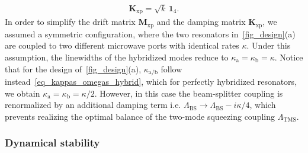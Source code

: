 \documentclass[%
reprint,
floatfix,
superscriptaddress,
amsmath,amssymb,
aps,
pra,
]{revtex4-2}
\newcommand*{\scrpt}[1]{\mathrm{#1}}
\newcommand*{\s}[1]{\ensuremath{_\scrpt{#1}}}
\begin{document}
%
\begin{align}
\label{KXP}
\mathbf{K}\s{xp} = \sqrt{k} \, \mathbf{1}\s{\mathrm{4}}. 
\end{align}
%
In order to simplify the drift matrix $\mathbf{M}\s{xp}$ and the damping matrix $\mathbf{K}\s{xp}$, we assumed a symmetric configuration, where the two resonators in~\cref{fig_design}(a) are coupled to two different microwave ports with identical rates $\kappa$. Under this assumption, the linewidths of the hybridized modes reduce to $\kappa\s{a} = \kappa\s{b} = \kappa$. Notice that for the design of~\cref{fig_design}(a), $\kappa_\mathrm{a/b}$ follow instead~\cref{eq_kappas_omegas_hybrid}, which for perfectly hybridized resonators, we obtain $\kappa\s{a} = \kappa\s{b} = \kappa/2$. However, in this case the beam-splitter coupling is renormalized by an additional damping term i.e. $\Lambda_\mathrm{BS}\rightarrow\Lambda_\mathrm{BS}-i\kappa/4$, which prevents realizing the optimal balance of the two-mode squeezing coupling $\Lambda_\mathrm{TMS}$.

\subsubsection{Dynamical stability}
\label{A_dyn_stability}
\end{document}
